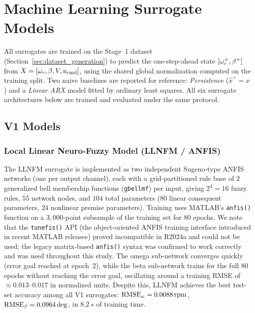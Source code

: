 
\section{Machine Learning Surrogate Models}
\label{sec:ml_surrogates}

All surrogates are trained on the Stage~1 dataset
(Section~\ref{sec:dataset_generation}) to predict the one-step-ahead state
$[\omega_r^{+},\beta^{+}]$ from $X=[\omega_r,\beta,V,u_{\text{cmd}}]$, using the
shared global normalization computed on the training split. Two naive
baselines are reported for reference: \emph{Persistence}
($\hat{x}^{+}=x$) and a \emph{Linear ARX} model fitted by ordinary least
squares. All six surrogate architectures below are trained and evaluated
under the same protocol.

\subsection{V1 Models}
\label{subsec:v1_models}

\subsubsection{Local Linear Neuro-Fuzzy Model (LLNFM / ANFIS)}
\label{subsubsec:llnfm}

The LLNFM surrogate is implemented as two independent Sugeno-type
ANFIS \cite{jang_anfis_1993} networks (one per output channel), each
with a grid-partitioned rule base
of $2$ generalized bell membership functions (\texttt{gbellmf}) per input,
giving $2^4=16$ fuzzy rules, $55$ network nodes, and $104$ total parameters
($80$ linear consequent parameters, $24$ nonlinear premise parameters).
Training uses MATLAB's \texttt{anfis()} function on a $3{,}000$-point
subsample of the training set for $80$ epochs. We note that the
\texttt{tunefis()} API (the object-oriented ANFIS training interface
introduced in recent MATLAB releases) proved incompatible in R2024a and
could not be used; the legacy matrix-based \texttt{anfis()} syntax was
confirmed to work correctly and was used throughout this study. The omega
sub-network converges quickly (error goal reached at epoch~2), while the
beta sub-network trains for the full $80$ epochs without reaching the error
goal, oscillating around a training RMSE of $\approx 0.013$--$0.017$ in
normalized units. Despite this, LLNFM achieves the best test-set accuracy
among all V1 surrogates: $\text{RMSE}_{\omega} = \SI{0.0088}{rpm}$,
$\text{RMSE}_{\beta} = 0.0964\deg$, in $\SI{8.2}{s}$ of training time.

